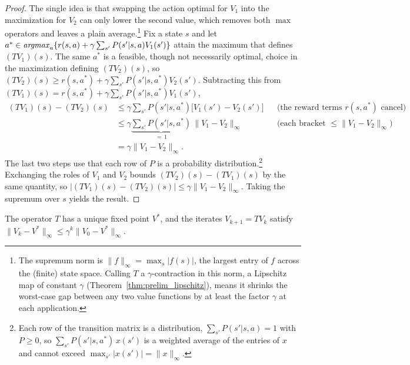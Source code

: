 \begin{proof}
The single idea is that swapping the action optimal for $V_1$ into the maximization for $V_2$ can only lower the second value, which removes both $\max$ operators and leaves a plain average.\footnote{The supremum norm is $\|f\|_\infty = \max_{s} |f(s)|$, the largest entry of $f$ across the (finite) state space. Calling $T$ a $\gamma$-contraction in this norm, a Lipschitz map of constant $\gamma$ (Theorem~\ref{thm:prelim_lipschitz}), means it shrinks the worst-case gap between any two value functions by at least the factor $\gamma$ at each application.} Fix a state $s$ and let $a^* \in \mathop{\it argmax}_{a} \{ r(s,a) + \gamma \sum_{s'} P(s'|s,a) V_1(s') \}$ attain the maximum that defines $(TV_1)(s)$. The same $a^*$ is a feasible, though not necessarily optimal, choice in the maximization defining $(TV_2)(s)$, so $(TV_2)(s) \geq r(s,a^*) + \gamma \sum_{s'} P(s'|s,a^*) V_2(s')$. Subtracting this from $(TV_1)(s) = r(s,a^*) + \gamma \sum_{s'} P(s'|s,a^*) V_1(s')$,
\begin{align*}
(TV_1)(s) - (TV_2)(s)
  &\leq \gamma \sum_{s'} P(s'|s,a^*)\big[ V_1(s') - V_2(s') \big]
    && \text{(the reward terms $r(s,a^*)$ cancel)} \\
  &\leq \gamma \underbrace{\sum_{s'} P(s'|s,a^*)}_{=\,1}\, \|V_1 - V_2\|_\infty
    && \text{(each bracket $\leq \|V_1 - V_2\|_\infty$)} \\
  &= \gamma \|V_1 - V_2\|_\infty .
\end{align*}
The last two steps use that each row of $P$ is a probability distribution.\footnote{Each row of the transition matrix is a distribution, $\sum_{s'} P(s'|s,a) = 1$ with $P \geq 0$, so $\sum_{s'} P(s'|s,a^*)\, x(s')$ is a weighted average of the entries of $x$ and cannot exceed $\max_{s'} |x(s')| = \|x\|_\infty$.} Exchanging the roles of $V_1$ and $V_2$ bounds $(TV_2)(s) - (TV_1)(s)$ by the same quantity, so $|(TV_1)(s) - (TV_2)(s)| \leq \gamma \|V_1 - V_2\|_\infty$. Taking the supremum over $s$ yields the result.
\end{proof}

\begin{corollary}
\label{cor:vi_convergence}
The operator $T$ has a unique fixed point $V^*$, and the iterates $V_{k+1} = TV_k$ satisfy $\|V_k - V^*\|_\infty \leq \gamma^k \|V_0 - V^*\|_\infty$.
\end{corollary}

